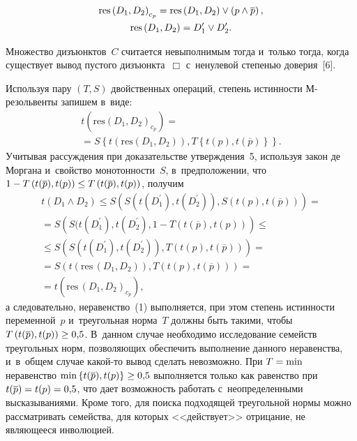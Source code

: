\begin{multicols}{2}
\columnbreak

\noindent
\begin{multline*}
\mathrm{res}\left (D_1,D_2\right)_{c_p} = \mathrm{res}\left(D_1, D_2\right)\vee \left(p\wedge \overline{p}\right),
\\
\mathrm{res}\,(D_1,D_2)\hm= D_1^\prime \vee D_2^\prime.
\end{multline*}


  
  Множество дизъюнктов~$C$ считается невыполнимым тогда и~только тогда, 
когда существует вывод пустого дизъюнкта~$\Box$ с~ненулевой степенью 
доверия~[6].
  
  Используя пару $(T,S)$ двойственных операций, степень истинности  
М-ре\-золь\-вен\-ты запишем в~\mbox{виде}: 
\begin{multline*}
t\left(\mathrm{res}\left(D_1,D_2\right)_{c_p}\right) ={}\\
{}= S\left\{ t\left( \mathrm{res}\left(D_1, D_2\right)\right), 
T\left\{ t(p), t\left(\overline{p}\right)\right\}\right\}.
\end{multline*}
 Учитывая рассуждения при 
доказательстве утверж\-де\-ния~5, используя закон де Моргана и~свойство 
мо\-но\-тон\-ности~$S$, в~предположении, что $1\hm- T\left( t(\overline{p}), 
t(p)\right) \hm\leq T\left( t(\overline{p}), t(p)\right)$, получим
  \begin{multline*}
  t(D_1\wedge D_2) \leq S\left( S\left(t(D_1^\prime), t(D_2^\prime)\right), S(t(p), 
t(\overline{p}))\right)={}\\
  {}=
  S\left( S(t(D_1^\prime), t(D_2^\prime), 1-T(t(\overline{p}), t(p))\right)\leq{}\\
  {}\leq
  S\left( S(t(D_1^\prime), t(D_2^\prime)), T(t(p), t(\overline{p}))\right)={}\\
  {}=
  S\left( t(\mathrm{res}\,(D_1, D_2)), T(t(p), t(\overline{p}))\right)={}\\
  {}=
  t\left( \mathrm{res}\,(D_1, D_2)_{c_p}\right),
  \end{multline*}
а следовательно, неравенство~(1) выполняется, при этом степень истинности 
переменной~$p$ и~треугольная норма~$T$ должны быть такими, чтобы\linebreak $T\left( 
t(\overline{p}), t(p)\right) \hm\geq 0{,}5$. В~данном случае необходимо 
исследование семейств треугольных норм, поз\-во\-ля\-ющих обеспечить 
выполнение данного неравенства, и~в~общем случае ка\-кой-то вывод \mbox{сделать} 
невозможно. При $T\hm=\min$ неравенство $\min \left\{ t(\overline{p}), 
t(p)\right\} \hm\geq 0{,}5$ выполняется только как равенство при 
$t(\overline{p})\hm= t(p)\hm=0{,}5$, что дает воз\-мож\-ность работать 
с~неопределенными высказываниями. Кроме того, для поиска подходящей 
\mbox{треугольной} нормы можно рассматривать семейства, для которых 
<<действует>> отрицание, не являющееся инволюцией.


\end{multicols}
